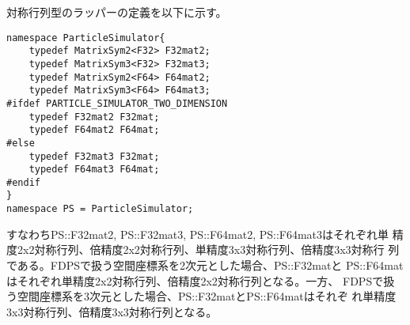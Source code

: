 対称行列型のラッパーの定義を以下に示す。
\begin{lstlisting}[caption=matrixsymwrapper]
namespace ParticleSimulator{
    typedef MatrixSym2<F32> F32mat2;
    typedef MatrixSym3<F32> F32mat3;
    typedef MatrixSym2<F64> F64mat2;
    typedef MatrixSym3<F64> F64mat3;
#ifdef PARTICLE_SIMULATOR_TWO_DIMENSION
    typedef F32mat2 F32mat;
    typedef F64mat2 F64mat;
#else
    typedef F32mat3 F32mat;
    typedef F64mat3 F64mat;
#endif
}
namespace PS = ParticleSimulator;
\end{lstlisting}

すなわちPS::F32mat2, PS::F32mat3, PS::F64mat2, PS::F64mat3はそれぞれ単
精度2x2対称行列、倍精度2x2対称行列、単精度3x3対称行列、倍精度3x3対称行
列である。FDPSで扱う空間座標系を2次元とした場合、PS::F32matと
PS::F64matはそれぞれ単精度2x2対称行列、倍精度2x2対称行列となる。一方、
FDPSで扱う空間座標系を3次元とした場合、PS::F32matとPS::F64matはそれぞ
れ単精度3x3対称行列、倍精度3x3対称行列となる。

